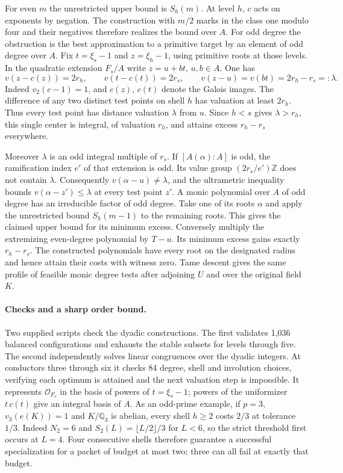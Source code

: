 For even $m$ the unrestricted upper bound is $S_h(m)$. At level $h$,
$c$ acts on exponents by negation. The construction with $m/2$ marks
in the class one modulo four and their negatives therefore realizes
the bound over $A$. For odd degree the obstruction is the best
approximation to a primitive target by an element of odd degree over $A$.
Fix $t=\xi_s-1$ and $z=\xi_h-1$, using primitive roots at those levels.
In the quadratic extension $F_s/A$ write $z=u+bt$, $u,b\in A$. One has
\[
 v(z-c(z))=2r_h,\qquad v(t-c(t))=2r_s,\qquad
 v(z-u)=v(bt)=2r_h-r_s=: \lambda .
\]
Indeed $v_2(c-1)=1$, and $c(z)$, $c(t)$ denote the Galois images.
The difference of any two distinct test points on shell $h$ has valuation
at least $2r_h$. Thus every test point has distance valuation $\lambda$
from $u$. Since $h<s$ gives $\lambda>r_h$, this single center is
integral, of valuation $r_h$, and attains excess $r_h-r_s$ everywhere.

Moreover $\lambda$ is an odd integral multiple of $r_s$. If $[A(\alpha):A]$
is odd, the ramification index $e'$ of that extension is odd. Its value
group $(2r_s/e')\mathbb Z$ does not contain $\lambda$.
Consequently $v(\alpha-u)\ne\lambda$, and the ultrametric inequality
bounds $v(\alpha-z')\le\lambda$ at every test point $z'$.
A monic polynomial over $A$ of odd degree has an irreducible factor of
odd degree. Take one of its roots $\alpha$ and apply the unrestricted
bound $S_h(m-1)$ to the remaining roots. This gives the claimed upper
bound for its minimum excess. Conversely multiply the extremizing
even-degree polynomial by $T-u$. Its minimum excess gains exactly
$r_h-r_s$. The constructed polynomials have every root on the designated
radius and hence attain their costs with witness zero.
Tame descent gives the same profile of feasible monic degree tests
after adjoining $U$ and over the original field $K$.

\paragraph{Checks and a sharp order bound.}
Two supplied scripts check the dyadic constructions.
The first validates 1,036 balanced configurations and exhausts the stable
subsets for levels through five. The second independently solves linear
congruences over the dyadic integers. At conductors three through six it
checks 84 degree, shell and involution choices, verifying each optimum is
attained and the next valuation step is impossible. It represents
$\mathcal O_{F_s}$ in the basis of powers of $t=\xi_s-1$; powers of
the uniformizer $t\,c(t)$ give an integral basis of $A$.
As an odd-prime example, if $p=3$, $v_3(e(K))=1$ and $K/\mathbb Q_3$
is abelian, every shell $h\ge2$ costs $2/3$ at tolerance $1/3$.
Indeed $N_2=6$ and $S_2(L)=\lfloor L/2\rfloor/3$ for $L<6$,
so the strict threshold first occurs at $L=4$. Four consecutive shells
therefore guarantee a successful specialization for a packet of budget
at most two; three can all fail at exactly that budget.
